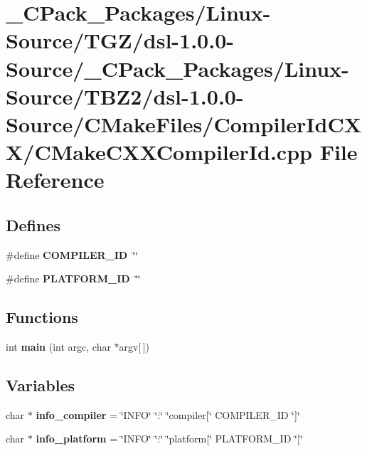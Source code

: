 \section{\_\-CPack\_\-Packages/Linux-\/Source/TGZ/dsl-\/1.0.0-\/Source/\_\-CPack\_\-Packages/Linux-\/Source/TBZ2/dsl-\/1.0.0-\/Source/CMakeFiles/CompilerIdCXX/CMakeCXXCompilerId.cpp File Reference}
\label{__CPack__Packages_2Linux-Source_2TGZ_2dsl-1_80_80-Source_2__CPack__Packages_2Linux-Source_2TBZ2_cf791ba9d7bf1b8493d4576ddb24831f}
\subsection*{Defines}
\begin{DoxyCompactItemize}
\item 
\#define {\bf COMPILER\_\-ID}~\char`\"{}\char`\"{}
\item 
\#define {\bf PLATFORM\_\-ID}~\char`\"{}\char`\"{}
\end{DoxyCompactItemize}
\subsection*{Functions}
\begin{DoxyCompactItemize}
\item 
int {\bf main} (int argc, char $\ast$argv[$\,$])
\end{DoxyCompactItemize}
\subsection*{Variables}
\begin{DoxyCompactItemize}
\item 
char $\ast$ {\bf info\_\-compiler} = \char`\"{}INFO\char`\"{} \char`\"{}:\char`\"{} \char`\"{}compiler[\char`\"{} COMPILER\_\-ID \char`\"{}]\char`\"{}
\item 
char $\ast$ {\bf info\_\-platform} = \char`\"{}INFO\char`\"{} \char`\"{}:\char`\"{} \char`\"{}platform[\char`\"{} PLATFORM\_\-ID \char`\"{}]\char`\"{}
\end{DoxyCompactItemize}


